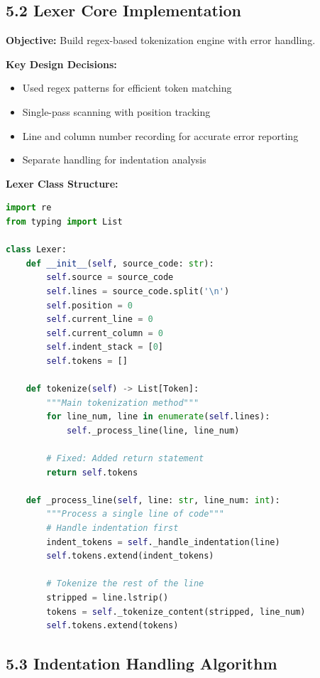 \documentclass[a4paper,11pt]{article}
\begin{document}
\subsection{5.2 Lexer Core Implementation}

\textbf{Objective:} Build regex-based tokenization engine with error handling.

\textbf{Key Design Decisions:}
\begin{itemize}[leftmargin=*]
    \item Used regex patterns for efficient token matching
    \item Single-pass scanning with position tracking
    \item Line and column number recording for accurate error reporting
    \item Separate handling for indentation analysis
\end{itemize}

\textbf{Lexer Class Structure:}

\begin{lstlisting}[language=Python, caption=Lexer Implementation Excerpt]
import re
from typing import List

class Lexer:
    def __init__(self, source_code: str):
        self.source = source_code
        self.lines = source_code.split('\n')
        self.position = 0
        self.current_line = 0
        self.current_column = 0
        self.indent_stack = [0]
        self.tokens = []
        
    def tokenize(self) -> List[Token]:
        """Main tokenization method"""
        for line_num, line in enumerate(self.lines):
            self._process_line(line, line_num)
        
        # Fixed: Added return statement
        return self.tokens
    
    def _process_line(self, line: str, line_num: int):
        """Process a single line of code"""
        # Handle indentation first
        indent_tokens = self._handle_indentation(line)
        self.tokens.extend(indent_tokens)
        
        # Tokenize the rest of the line
        stripped = line.lstrip()
        tokens = self._tokenize_content(stripped, line_num)
        self.tokens.extend(tokens)
\end{lstlisting}

\subsection{5.3 Indentation Handling Algorithm}
\end{document}
